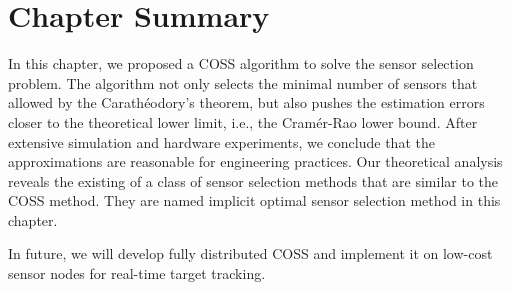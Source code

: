 \section{Chapter Summary}\label{s:conclusion}
In this chapter, we proposed a COSS algorithm to solve the sensor selection problem.
    The algorithm not only selects the minimal number of sensors that allowed by the Carath\'{e}odory's theorem, but also pushes the estimation errors closer to the theoretical lower limit, i.e., the Cram\'{e}r-Rao lower bound. %
After extensive simulation and hardware experiments, we conclude that the approximations are reasonable for engineering practices.
    Our theoretical analysis reveals the existing of a class of sensor selection methods that are similar to the COSS method. They are named implicit optimal sensor selection method in this chapter.

In future, we will develop fully distributed COSS and implement it on low-cost sensor nodes for real-time target tracking.




